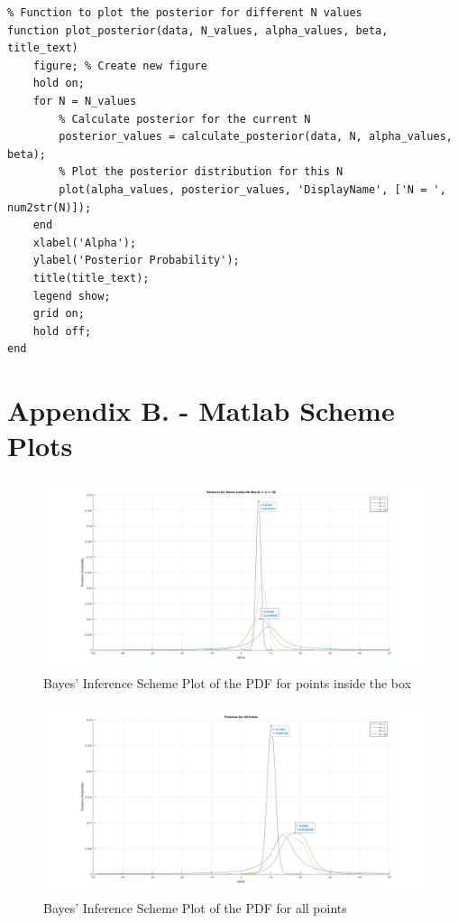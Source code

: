 \documentclass[a4paper,11pt]{article}
\begin{document}
\begin{lstlisting}
% Function to plot the posterior for different N values
function plot_posterior(data, N_values, alpha_values, beta, title_text)
    figure; % Create new figure
    hold on;
    for N = N_values
        % Calculate posterior for the current N
        posterior_values = calculate_posterior(data, N, alpha_values, beta);
        % Plot the posterior distribution for this N
        plot(alpha_values, posterior_values, 'DisplayName', ['N = ', num2str(N)]);
    end
    xlabel('Alpha');
    ylabel('Posterior Probability');
    title(title_text);
    legend show;
    grid on;
    hold off;
end
\end{lstlisting}

\newpage
\section{Appendix B. - Matlab Scheme Plots}

\begin{figure}[h]
        \centering
        \includegraphics[scale=0.2]{q07pdfinbox.jpg} 
        \caption{Bayes' Inference Scheme Plot of the PDF for points inside the box}
\end{figure}	

\begin{figure}[h]
        \centering
        \includegraphics[scale=0.2]{q07pdfoutbox.jpg} 
        \caption{Bayes' Inference Scheme Plot of the PDF for all points}
\end{figure}	
\end{document}
